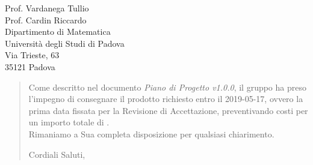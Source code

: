 \begin{letter}{
		Prof. Vardanega Tullio \\
		Prof. Cardin Riccardo \\
		Dipartimento di Matematica \\
		Università degli Studi di Padova \\
		Via Trieste, 63 \\
		35121 Padova}
\begin{quotation}
\noindent Come descritto nel documento \textit{Piano di Progetto v1.0.0}, il gruppo ha preso l'impegno di
consegnare il prodotto richiesto entro il 2019-05-17, ovvero la prima data 
fissata per la Revisione di Accettazione, preventivando costi per un importo 
totale di \textbf{}.\\
Rimaniamo a Sua completa disposizione per qualsiasi chiarimento.

\vspace{0.5cm}
\closing{ Cordiali Saluti,}
	

\end{quotation}
		
\end{letter}


